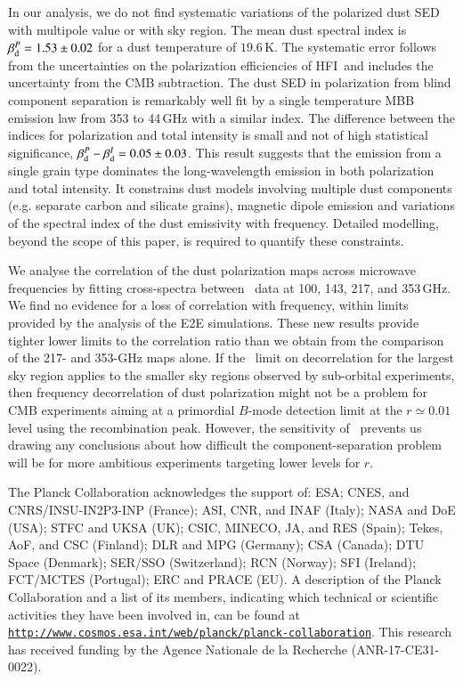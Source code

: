 \documentclass[longauth,traditabstract]{aa}
\newcommand{\HFI}{HFI}
\newcommand{\vbetap}{1.53} %
\newcommand{\vbetapu}{0.02} %
\newcommand{\vdbetapi}{0.05} %
\newcommand{\vdbetapiu}{0.03} %
\begin{document}
In our analysis, we do not find systematic variations of the polarized dust SED with multipole value or with sky region.
The mean dust spectral index is $\beta_{\rm d}^P= \vbetap\pm\vbetapu$ for a dust temperature of $19.6$\,K.
The systematic error follows from the uncertainties on the polarization efficiencies of \HFI\ and 
includes the uncertainty from the CMB subtraction. 
The dust SED in polarization from blind component separation is remarkably well fit by a single temperature MBB 
emission law from 353 to 44\,GHz with a similar index.
The difference between the indices for polarization and total intensity is small and not of high statistical significance, $\beta_{\rm d}^P - \beta_{\rm d}^I
= \vdbetapi\pm\vdbetapiu$. 
This result suggests that the emission from a single grain type dominates the long-wavelength emission in both polarization and total intensity.
It constrains dust models involving multiple dust components (e.g. separate carbon and silicate grains), 
magnetic dipole emission and variations of the spectral index of the dust emissivity with frequency. Detailed modelling, beyond the scope of this paper,
is required to quantify these constraints. 


We analyse the correlation of the dust polarization maps across microwave frequencies by fitting cross-spectra between \Planck\ data at 100, 143, 217, and 353\,GHz. 
We find no evidence for a loss of correlation with frequency, within limits provided by the analysis of the E2E simulations. These new results provide tighter lower limits to the correlation ratio than we obtain from the comparison of the 217- and 353-GHz maps alone.
If the \Planck\ limit on decorrelation for the largest sky region applies to the smaller sky regions observed by sub-orbital experiments, 
then frequency decorrelation of dust polarization might not be a problem for CMB experiments aiming at a primordial $B$-mode detection limit at the $r\simeq0.01$ level using the recombination peak.
However, the sensitivity of \Planck\ prevents us drawing any conclusions about how difficult the component-separation problem will be
for more ambitious experiments targeting lower levels for $r$.


\begin{acknowledgements}
The Planck Collaboration acknowledges the support of: ESA; CNES, and
CNRS/INSU-IN2P3-INP (France); ASI, CNR, and INAF (Italy); NASA and DoE
(USA); STFC and UKSA (UK); CSIC, MINECO, JA, and RES (Spain); Tekes, AoF,
and CSC (Finland); DLR and MPG (Germany); CSA (Canada); DTU Space
(Denmark); SER/SSO (Switzerland); RCN (Norway); SFI (Ireland);
FCT/MCTES (Portugal); ERC and PRACE (EU). A description of the Planck
Collaboration and a list of its members, indicating which technical
or scientific activities they have been involved in, can be found at
\href{http://www.cosmos.esa.int/web/planck/planck-collaboration}{\texttt{http://www.cosmos.esa.int/web/planck/planck-collaboration}}.
This research has received funding by the Agence Nationale de la Recherche (ANR-17-CE31-0022).
\end{acknowledgements}
\end{document}

